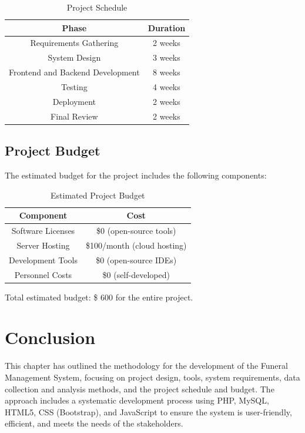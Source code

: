 \documentclass[a4paper,12pt]{report}
\begin{document}
\begin{table}[ht]
\centering
\begin{tabular}{|c|c|}
\hline
\textbf{Phase} & \textbf{Duration} \\
\hline
Requirements Gathering & 2 weeks \\
System Design & 3 weeks \\
Frontend and Backend Development & 8 weeks \\
Testing & 4 weeks \\
Deployment & 2 weeks \\
Final Review & 2 weeks \\
\hline
\end{tabular}
\caption{Project Schedule}
\label{tab:project_schedule}
\end{table}

\subsection{Project Budget}
The estimated budget for the project includes the following components:

\begin{table}[ht]
\centering
\begin{tabular}{|c|c|}
\hline
\textbf{Component} & \textbf{Cost} \\
\hline
Software Licenses & \$0 (open-source tools) \\
Server Hosting & \$100/month (cloud hosting) \\
Development Tools & \$0 (open-source IDEs) \\
Personnel Costs & \$0 (self-developed) \\
\hline
\end{tabular}
\caption{Estimated Project Budget}
\label{tab:project_budget}
\end{table}

Total estimated budget: \$ 600 for the entire project.

\section{Conclusion}
This chapter has outlined the methodology for the development of the Funeral Management System, focusing on project design, tools, system requirements, data collection and analysis methods, and the project schedule and budget. The approach includes a systematic development process using PHP, MySQL, HTML5, CSS (Bootstrap), and JavaScript to ensure the system is user-friendly, efficient, and meets the needs of the stakeholders.
\end{document}
